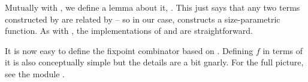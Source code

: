 Mutually with , we define a lemma about it,
. This just says that any two terms constructed by
 are related by  -- so in our case,
 constructs a size-parametric function. As with
, the implementations of  and
 are straightforward.

It is now easy to define the fixpoint combinator  based on
. Defining $f$ in terms of it is also conceptually simple but
the details are a bit gnarly. For the full picture, see the module
.
